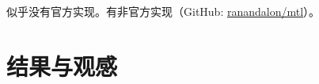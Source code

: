 \documentclass[a4paper,punct]{ctexart}
\begin{document}
似乎没有官方实现。有非官方实现（GitHub: \href{https://github.com/ranandalon/mtl}{ranandalon/mtl}）。




\section{结果与观感}




\end{document}
